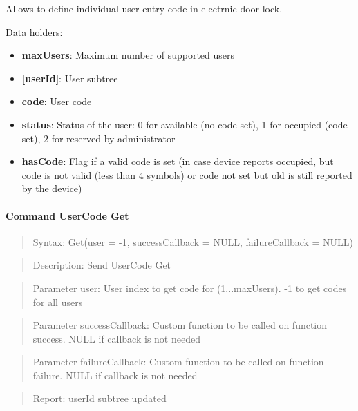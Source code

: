 Allows to define individual user entry code in electrnic door lock.
\newline

\noindent
Data holders:

\begin{itemize}
\item \textbf{maxUsers}: Maximum number of supported users
\item \textbf{[userId]}: User subtree
\item \qquad\textbf{code}: User code
\item \qquad\textbf{status}: Status of the user: 0 for available (no code set), 1 for occupied (code set), 2 for reserved by administrator
\item \qquad\textbf{hasCode}: Flag if a valid code is set (in case device reports occupied, but code is not valid (less than 4 symbols) or code not set but old is still reported by the device)
\end{itemize}

\paragraph{Command UserCode Get}
\begin{quote}Syntax: Get(user = -1, successCallback = NULL, failureCallback = NULL)\end{quote}
\begin{quote}Description: Send UserCode Get\end{quote}
\begin{quote}Parameter user: User index to get code for (1...maxUsers). -1 to get codes for all users\end{quote}
\begin{quote}Parameter successCallback: Custom function to be called on function success. NULL if callback is not needed\end{quote}
\begin{quote}Parameter failureCallback: Custom function to be called on function failure. NULL if callback is not needed\end{quote}
\begin{quote}Report: userId subtree updated\end{quote}

